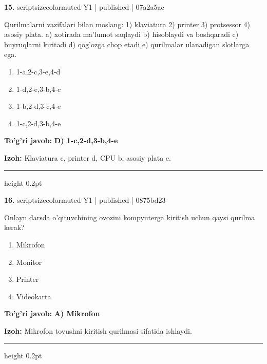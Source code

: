 \documentclass[10pt,a4paper]{article}
\begin{document}
{\bfseries\sffamily\color{ink} 15.} {scriptsizecolor{muted} Y1 | published | 07a2a5ac}
\par
Qurilmalarni vazifalari bilan moslang: 1) klaviatura 2) printer 3) protsessor 4) asosiy plata. a) xotirada ma'lumot saqlaydi b) hisoblaydi va boshqaradi c) buyruqlarni kiritadi d) qog'ozga chop etadi e) qurilmalar ulanadigan slotlarga ega.
\begin{enumerate}[label=\Alph*),leftmargin=9mm]
\item 1-a,2-c,3-e,4-d
\item 1-d,2-e,3-b,4-c
\item 1-b,2-d,3-c,4-e
\item 1-c,2-d,3-b,4-e
\end{enumerate}
\begin{tcolorbox}[enhanced,breakable,colback=teal!4,colframe=teal!60!black,boxrule=0.45pt,arc=1.2mm,left=2.7mm,right=2.7mm,top=1.8mm,bottom=1.8mm,before skip=2mm,after skip=2mm]
{\bfseries\sffamily\color{teal}To'g'ri javob:} \textbf{D) 1-c,2-d,3-b,4-e}
\par\smallskip
{\bfseries Izoh:} Klaviatura c, printer d, CPU b, asosiy plata e.
\end{tcolorbox}
\vspace{2mm}\hrule height 0.2pt\vspace{3mm}

{\bfseries\sffamily\color{ink} 16.} {scriptsizecolor{muted} Y1 | published | 0875bd23}
\par
Onlayn darsda o'qituvchining ovozini kompyuterga kiritish uchun qaysi qurilma kerak?
\begin{enumerate}[label=\Alph*),leftmargin=9mm]
\item Mikrofon
\item Monitor
\item Printer
\item Videokarta
\end{enumerate}
\begin{tcolorbox}[enhanced,breakable,colback=teal!4,colframe=teal!60!black,boxrule=0.45pt,arc=1.2mm,left=2.7mm,right=2.7mm,top=1.8mm,bottom=1.8mm,before skip=2mm,after skip=2mm]
{\bfseries\sffamily\color{teal}To'g'ri javob:} \textbf{A) Mikrofon}
\par\smallskip
{\bfseries Izoh:} Mikrofon tovushni kiritish qurilmasi sifatida ishlaydi.
\end{tcolorbox}
\vspace{2mm}\hrule height 0.2pt\vspace{3mm}
\end{document}
